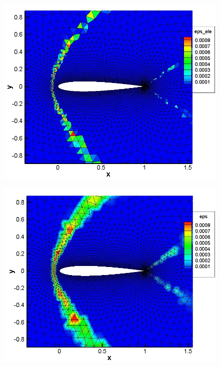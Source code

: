 \begin{figure}
\centering
\begin{minipage}[t]{.5\textwidth}
  \centering
  \includegraphics[width=.85\linewidth]{./figures/M1pt6-inv-av-ele-mesh}
  \label{fig:AV-ele}
\end{minipage}%
\begin{minipage}[t]{.5\textwidth}
  \centering
  \includegraphics[width=.85\linewidth]{./figures/M1pt6-inv-av-mesh}
  \label{fig:AV-cont}
\end{minipage}
\end{figure} 

